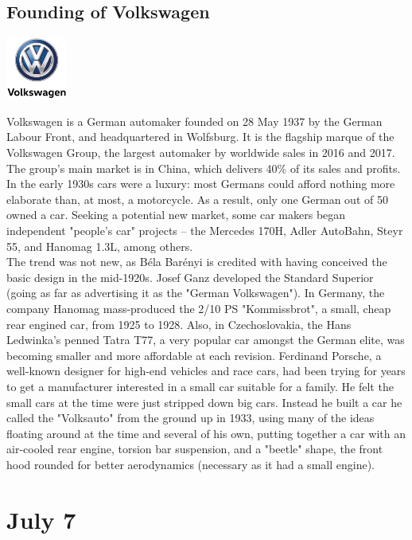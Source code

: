 \documentclass[11pt]{report}
\begin{document}
\subsection{Founding of Volkswagen}
\vspace{2mm}\begin{center}\includegraphics[width=2cm]{./img/volkswagenLogo.jpg}\end{center}
Volkswagen is a German automaker founded on 28 May 1937 by the German Labour Front, and headquartered in Wolfsburg. It is the flagship marque of the Volkswagen Group, the largest automaker by worldwide sales in 2016 and 2017. The group's main market is in China, which delivers 40\% of its sales and profits.\\ \indent In the early 1930s cars were a luxury: most Germans could afford nothing more elaborate than, at most, a motorcycle. As a result, only one German out of 50 owned a car. Seeking a potential new market, some car makers began independent "people's car" projects – the Mercedes 170H, Adler AutoBahn, Steyr 55, and Hanomag 1.3L, among others.\\ \indent The trend was not new, as Béla Barényi is credited with having conceived the basic design in the mid-1920s. Josef Ganz developed the Standard Superior (going as far as advertising it as the "German Volkswagen"). In Germany, the company Hanomag mass-produced the 2/10 PS "Kommissbrot", a small, cheap rear engined car, from 1925 to 1928. Also, in Czechoslovakia, the Hans Ledwinka's penned Tatra T77, a very popular car amongst the German elite, was becoming smaller and more affordable at each revision. Ferdinand Porsche, a well-known designer for high-end vehicles and race cars, had been trying for years to get a manufacturer interested in a small car suitable for a family. He felt the small cars at the time were just stripped down big cars. Instead he built a car he called the "Volksauto" from the ground up in 1933, using many of the ideas floating around at the time and several of his own, putting together a car with an air-cooled rear engine, torsion bar suspension, and a "beetle" shape, the front hood rounded for better aerodynamics (necessary as it had a small engine).
\section{July 7}
\end{document}
